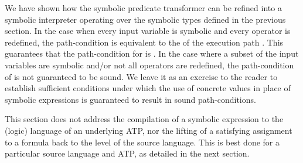 ﻿\documentclass{IOS-Book-Article}
\begin{document}
\begin{mdP}[data-line={584}]%
{}We have shown how the symbolic predicate transformer %
{}%
{} can 
be refined into a symbolic interpreter operating over the
symbolic types defined in the previous section.
In the case when every input variable is symbolic and every
operator is redefined, the path-condition is equivalent to the
{}%
{} of the execution path %
{}%
{}. 
This guarantees that the path-condition for %
{}%
{} is %
{}%
{}.
In the case where a subset of the input variables are symbolic
and/or not all operators are redefined, the path-condition of %
{}%
{} 
is not guaranteed to be sound. We leave it as an exercise to the
reader to establish sufficient conditions under which the 
use of concrete values in place of symbolic expressions is 
guaranteed to result in sound path-conditions.%
\end{mdP}%
\begin{mdP}[class={indent},data-line={598}]%
{}This section does not address the compilation of a symbolic
expression to the (logic) language of an underlying ATP, nor the
lifting of a satisfying assignment to a formula back to the
level of the source language. This is best done for a particular
source language and ATP, as detailed in the next section.%
\end{mdP}%
\end{document}
